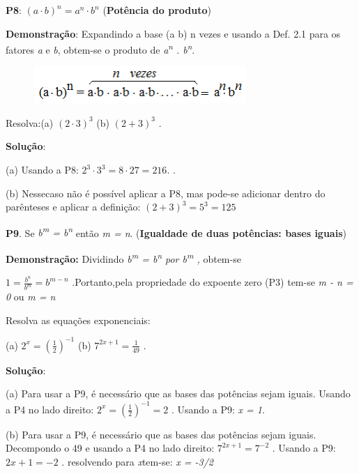 \begin{caixa}
\textbf{P8}:  \(  \left( a \cdot b \right) ^{n}=a^{n} \cdot b^{n} \)  (\textbf{Potência do produto})
\end{caixa}

\textbf{Demonstração}: Expandindo a base (a b) n vezes e usando a Def. 2.1 para os fatores \textit{a} e \textit{b}, obtem-se o produto de \textit{a\textsuperscript{n} . b\textsuperscript{n}}.

\begin{figure}[H]
	\begin{Center}
		\includegraphics[width=3.18in,height=0.55in]{capitulos/potencias_e_funcoes_exponenciais/media/image7.png}
	\end{Center}
\end{figure}

\qedsymbol{}

\begin{texemplo}
Resolva:(a)   \(  \left( 2 \cdot 3 \right) ^{3} \)  (b) \(   \left( 2+3 \right) ^{3} \) .

\textbf{Solução}: 

 (a) Usando a P8:  \( 2^{3} \cdot 3^{3}=8  \cdot 27=216. \)  .

 (b) Nessecaso não é possível aplicar a P8, mas pode-se adicionar dentro do parênteses e aplicar a definição:   \(  \left( 2+3 \right) ^{3}=5^{3}=125 \)  \qedsymbol{}
\end{texemplo}

\begin{caixa}
\textbf{P9}. Se \textit{b\textsuperscript{m} = b\textsuperscript{n}} então \textit{m = n}. (\textbf{Igualdade de duas potências: bases iguais})
\end{caixa}

\textbf{Demonstração: }Dividindo \textit{b\textsuperscript{m} = b\textsuperscript{n} por b\textsuperscript{m} , }obtem-se

  \( 1=\frac{b^{n}}{b^{m}}= b^{m-n} \) .Portanto,pela propriedade do expoente zero (P3) tem-se   \textit{m - n = 0} ou \textit{m = n} \qedsymbol{}

\begin{texemplo}
Resolva as equações exponenciais: 

 (a)  \( 2^{x}= \left( \frac{1}{2} \right) ^{-1} \)  (b) \(  7^{2x+1}=\frac{1}{49} \) .

\textbf{Solução}: 

 (a) Para usar a P9, é necessário que as bases das potências sejam iguais.  Usando a P4 no lado direito:  \( 2^{x}= \left( \frac{1}{2} \right) ^{-1}=2 \) . Usando a P9: \textit{x = 1}.

 (b) Para usar a P9, é necessário que as bases das potências sejam iguais.  Decompondo o 49 e usando a P4 no lado direito:  \( 7^{2x+1}=7^{-2} \)  . Usando a  P9:   \( 2x+1=-2 \)  . resolvendo para \textit{x}tem-se:  \textit{x = -3/2} \qedsymbol{}
\end{texemplo}

